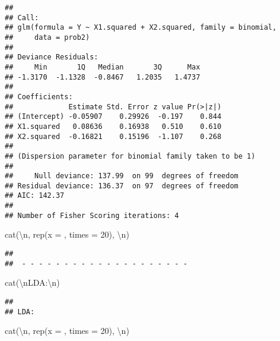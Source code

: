 \documentclass[
]{article}
\newenvironment{Shaded}{\begin{snugshade}}{\end{snugshade}}
\newcommand{\AttributeTok}[1]{\textcolor[rgb]{0.77,0.63,0.00}{#1}}
\newcommand{\DecValTok}[1]{\textcolor[rgb]{0.00,0.00,0.81}{#1}}
\newcommand{\FunctionTok}[1]{\textcolor[rgb]{0.00,0.00,0.00}{#1}}
\newcommand{\NormalTok}[1]{#1}
\newcommand{\SpecialCharTok}[1]{\textcolor[rgb]{0.00,0.00,0.00}{#1}}
\newcommand{\StringTok}[1]{\textcolor[rgb]{0.31,0.60,0.02}{#1}}
\begin{document}
\begin{verbatim}
## 
## Call:
## glm(formula = Y ~ X1.squared + X2.squared, family = binomial, 
##     data = prob2)
## 
## Deviance Residuals: 
##     Min       1Q   Median       3Q      Max  
## -1.3170  -1.1328  -0.8467   1.2035   1.4737  
## 
## Coefficients:
##             Estimate Std. Error z value Pr(>|z|)
## (Intercept) -0.05907    0.29926  -0.197    0.844
## X1.squared   0.08636    0.16938   0.510    0.610
## X2.squared  -0.16821    0.15196  -1.107    0.268
## 
## (Dispersion parameter for binomial family taken to be 1)
## 
##     Null deviance: 137.99  on 99  degrees of freedom
## Residual deviance: 136.37  on 97  degrees of freedom
## AIC: 142.37
## 
## Number of Fisher Scoring iterations: 4
\end{verbatim}

\begin{Shaded}
\begin{Highlighting}[]
\FunctionTok{cat}\NormalTok{(}\StringTok{\textquotesingle{}}\SpecialCharTok{\textbackslash{}n}\StringTok{\textquotesingle{}}\NormalTok{, }\FunctionTok{rep}\NormalTok{(}\AttributeTok{x =} \StringTok{\textquotesingle{}{-}\textquotesingle{}}\NormalTok{, }\AttributeTok{times =} \DecValTok{20}\NormalTok{), }\StringTok{\textquotesingle{}}\SpecialCharTok{\textbackslash{}n}\StringTok{\textquotesingle{}}\NormalTok{)}
\end{Highlighting}
\end{Shaded}

\begin{verbatim}
## 
##  - - - - - - - - - - - - - - - - - - - -
\end{verbatim}

\begin{Shaded}
\begin{Highlighting}[]
\FunctionTok{cat}\NormalTok{(}\StringTok{\textquotesingle{}}\SpecialCharTok{\textbackslash{}n}\StringTok{LDA:}\SpecialCharTok{\textbackslash{}n}\StringTok{\textquotesingle{}}\NormalTok{)}
\end{Highlighting}
\end{Shaded}

\begin{verbatim}
## 
## LDA:
\end{verbatim}

\begin{Shaded}
\begin{Highlighting}[]
\FunctionTok{cat}\NormalTok{(}\StringTok{\textquotesingle{}}\SpecialCharTok{\textbackslash{}n}\StringTok{\textquotesingle{}}\NormalTok{, }\FunctionTok{rep}\NormalTok{(}\AttributeTok{x =} \StringTok{\textquotesingle{}{-}\textquotesingle{}}\NormalTok{, }\AttributeTok{times =} \DecValTok{20}\NormalTok{), }\StringTok{\textquotesingle{}}\SpecialCharTok{\textbackslash{}n}\StringTok{\textquotesingle{}}\NormalTok{)}
\end{Highlighting}
\end{Shaded}
\end{document}
